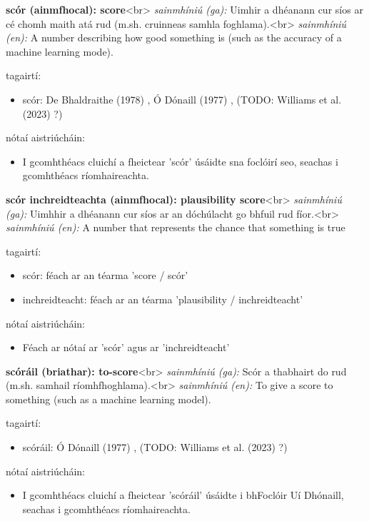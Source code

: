 \documentclass{article}
\begin{document}
\textbf{scór (ainmfhocal): score}<br>
\textit{sainmhíniú (ga):} Uimhir a dhéanann cur síos ar cé chomh maith atá rud (m.sh. cruinneas samhla foghlama).<br>
\textit{sainmhíniú (en):} A number describing how good something is (such as the accuracy of a machine learning mode).

tagairtí:
\begin{itemize}
	\item scór: De Bhaldraithe (1978) \cite{de-bhaldraithe}, Ó Dónaill (1977) \cite{odonaill}, (TODO: Williams et al. (2023) \cite{storchiste}?)
\end{itemize}

nótaí aistriúcháin:
\begin{itemize}
	\item I gcomhthéacs cluichí a fheictear 'scór' úsáidte sna foclóirí seo, seachas i gcomhthéacs ríomhaireachta.
\end{itemize}


\textbf{scór inchreidteachta (ainmfhocal): plausibility score}<br>
\textit{sainmhíniú (ga):} Uimhhir a dhéanann cur síos ar an dóchúlacht go bhfuil rud fíor.<br>
\textit{sainmhíniú (en):} A number that represents the chance that something is true

tagairtí:
\begin{itemize}
	\item scór: féach ar an téarma 'score / scór'
	\item inchreidteacht: féach ar an téarma 'plausibility / inchreidteacht'
\end{itemize}

nótaí aistriúcháin:
\begin{itemize}
	\item Féach ar nótaí ar 'scór' agus ar 'inchreidteacht'
\end{itemize}


\textbf{scóráil (briathar): to-score}<br>
\textit{sainmhíniú (ga):} Scór a thabhairt do rud (m.sh. samhail ríomhfhoghlama).<br>
\textit{sainmhíniú (en):} To give a score to something (such as a machine learning model).

tagairtí:
\begin{itemize}
	\item scóráil: Ó Dónaill (1977) \cite{odonaill}, (TODO: Williams et al. (2023) \cite{storchiste}?)
\end{itemize}

nótaí aistriúcháin:
\begin{itemize}
	\item I gcomhthéacs cluichí a fheictear 'scóráil' úsáidte i bhFoclóir Uí Dhónaill, seachas i gcomhthéacs ríomhaireachta.
\end{itemize}
\end{document}
